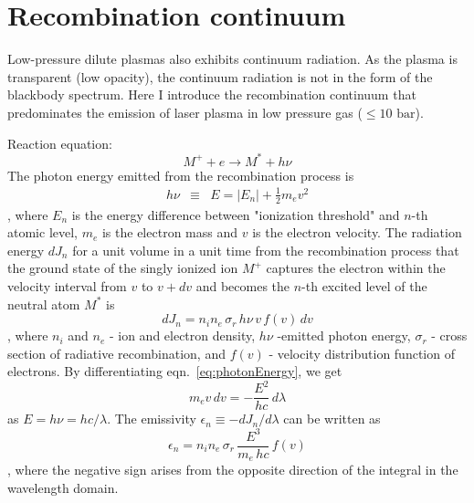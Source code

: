 
\chapter{Recombination continuum}
\label{sec:ap6}

Low-pressure dilute plasmas also exhibits continuum radiation. As the plasma is transparent (low opacity), the continuum radiation is not in the form of the blackbody spectrum. Here I introduce the recombination continuum that predominates the emission of laser plasma in low pressure gas ($\le 10 \text{ bar}$).

Reaction equation:
\begin{equation}
M^{+}+e\rightarrow M^{*}+h\nu
\end{equation}
The photon energy emitted from the recombination process is 
\begin{eqnarray}
h\nu & \equiv & E=\left|E_{n}\right|+\frac{1}{2}m_{e}v^{2}
\label{eq:photonEnergy}
\end{eqnarray}
, where $E_{n}$ is the energy difference between "ionization threshold" and $n$-th atomic level, $m_{e}$ is the electron mass and $v$ is the electron velocity. The radiation energy $dJ_{n}$ for a unit volume in a unit time from the recombination process that the ground state of the singly ionized ion $M^{+}$ captures the electron within the velocity interval from $v$ to $v+dv$ and becomes the $n$-th excited level of the neutral atom $M^{*}$ is
\begin{equation}
dJ_{n}=n_{i}n_{e}\,\sigma_{r}\,h\nu\,v\,f(v)\,dv
\end{equation}
, where $n_{i}$ and $n_{e}$ - ion and electron density, $h\nu$ -emitted photon energy, $\sigma_{r}$ - cross section of radiative recombination, and $f(v)$ - velocity distribution function of electrons. By differentiating eqn.~\ref{eq:photonEnergy}, we get
\begin{equation}
m_{e}v\,dv=-\frac{E^{2}}{hc}\,d\lambda
\end{equation}
 as $E=h\nu=hc/\lambda$. The emissivity $\epsilon_{n}\equiv-dJ_{n}/d\lambda$ can be written as
\begin{equation}
\epsilon_{n}=n_{i}n_{e}\,\sigma_{r}\,\frac{E^{3}}{m_{e}\,hc}\,f(v)
\end{equation}
, where the negative sign arises from the opposite direction of the integral in the wavelength domain.

